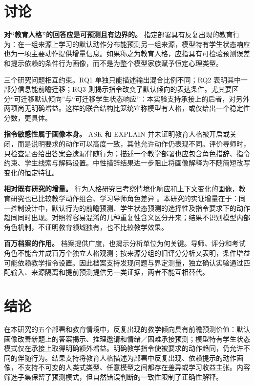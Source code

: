 \documentclass[11pt,a4paper,UTF8]{ctexart}
\begin{document}
\section{讨论}

\textbf{对“教育人格”的回答应是可预测且有边界的。} 指定部署具有反复出现的教育行为：在一组来源上学习的默认动作分布能预测另一组来源，模型特有学生状态响应也为一项主要动作提供增量信息。如果称之为教育人格，应指具有可检验预测误差和提示依赖的条件行为画像，而不是为整个模型家族赋予恒定心理类型。

三个研究问题相互约束。RQ1 单独只能描述输出混合比例不同；RQ2 表明其中一部分信息能前瞻迁移；RQ3 则揭示指令改变了默认倾向的表达条件。尤其要区分“可迁移默认倾向”与“可迁移学生状态响应”：本实验支持承接上的后者，对另外两项尚无明确增益。这样的联合结构比笼统宣称模型有人格，或仅给出一个稳定性分数，更具体。

\textbf{指令敏感性属于画像本身。} ASK 和 EXPLAIN 并未证明教育人格被开启或关闭，而是说明要求的动作可以高度一致，其他允许动作仍表现不同。评价导师时，只检查是否给出答案会遗漏伴随行为；描述一个教学部署也应包含角色措辞、指令约束、学生线索与解码设置。中性措辞结果进一步阻止将画像解释为不随简短改写变化的恒定特征。

\textbf{相对既有研究的增量。} 行为人格研究已考察情境化响应和上下文变化的画像，教育研究也已比较教学动作组合、学习导师角色差异 \citep{lee2025trait,liu2026bma,kucheria2025cima,lee2026tutorpersonas}。本研究的实证增量在于：同一控制设计中，默认行为的前瞻预测、学生状态预测的选择性及指令要求下的动作趋同同时出现。对照将容易混淆的几种重复性含义区分开来；结果不识别模型内部角色机制，不证明教育领域独有，也不比较教学效果。

\textbf{百万档案的作用。} 档案提供广度，也揭示分析单位为何关键。导师、评分和考试角色不能合并成百万个独立人格观测；按来源分组的旧评分分析又表明，条件增益可能依赖教学指令设置。因此档案支持发现问题与界定测量，独立确认实验通过匹配输入、来源隔离和提前预测提供另一类证据，两者不能互相替代。

\section{结论}

在本研究的五个部署和教育情境中，反复出现的教学倾向具有前瞻预测价值：默认画像改善新题上的答案揭示、推理邀请和情绪／困难承接预测；模型特有学生状态模式仅在承接上取得明确额外增益。明确教学指令使被要求的动作趋同，仍允许不同的伴随行为。结果支持将教育人格描述为部署中反复出现、依赖提示的动作画像，不支持不可变的人类式类型、任意模型之间都存在差异或学习收益主张。内容筛选子集保留了预测模式，但自然错误判断的一致性限制了正确性解释。
\end{document}
